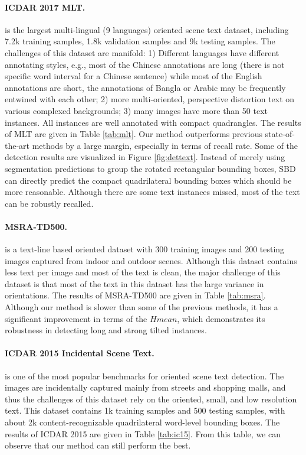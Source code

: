 \documentclass{article}
\begin{document}
\paragraph{ICDAR 2017 MLT.} \cite{nayef2017icdar2017} is the largest multi-lingual (9 languages) oriented scene text dataset, including 7.2k training samples, 1.8k validation samples and 9k testing samples. The challenges of this dataset are manifold: 1) Different languages have different annotating styles, e.g., most of the Chinese annotations are long (there is not specific word interval for a Chinese sentence) while most of the English annotations are short, the annotations of Bangla or Arabic may be frequently entwined with each other; 2) more multi-oriented, perspective distortion text on various complexed backgrounds; 3) many images have more than 50 text instances. All instances are well annotated with compact quadrangles. The results of MLT are given in Table \ref{tab:mlt}. Our method outperforms previous state-of-the-art methods by a large margin, especially in terms of recall rate. Some of the detection results are visualized in Figure \ref{fig:dettext}. Instead of merely using segmentation predictions to group the rotated rectangular bounding boxes, SBD can directly predict the compact quadrilateral bounding boxes which should be more reasonable. Although there are some text instances missed, most of the text can be robustly recalled.


\paragraph{MSRA-TD500.} \cite{Yao2012Detecting} is a text-line based oriented dataset with 300 training images and 200 testing images captured from indoor and outdoor scenes. Although this dataset contains less text per image and most of the text is clean, the major challenge of this dataset is that most of the text in this dataset has the large variance in orientations. The results of MSRA-TD500 are given in Table \ref{tab:msra}. Although our method is slower than some of the previous methods, it has a significant improvement in terms of the $Hmean$, which demonstrates its robustness in detecting long and strong tilted instances.

\paragraph{ICDAR 2015 Incidental Scene Text.} \cite{karatzas2015icdar} is one of the most popular benchmarks for oriented scene text detection. The images are incidentally captured mainly from streets and shopping malls, and thus the challenges of this dataset rely on the oriented, small, and low resolution text. This dataset contains 1k training samples and 500 testing samples, with about 2k content-recognizable quadrilateral word-level bounding boxes. The results of ICDAR 2015 are given in Table \ref{tab:ic15}. From this table, we can observe that our method can still perform the best. 
\end{document}
